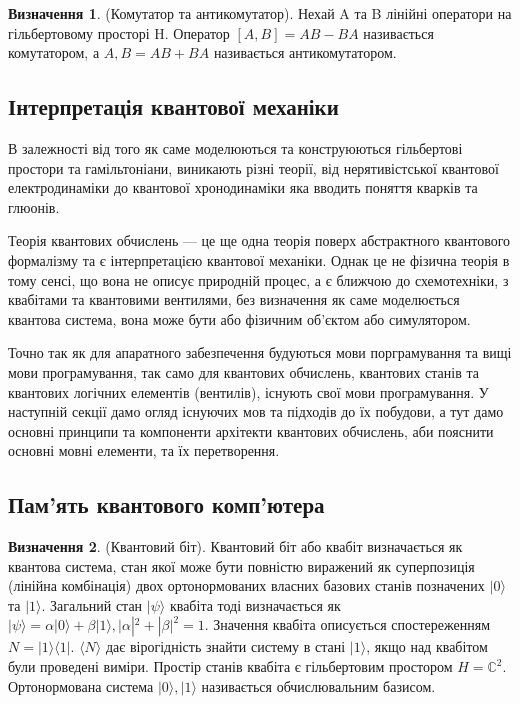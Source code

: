 \documentclass{article}
\theoremstyle{definition}
\newtheorem{definition}{Визначення}
\begin{document}
\begin{definition} (Комутатор та антикомутатор).
Нехай A та B лінійні оператори на гільбертовому просторі H.
Оператор $[A,B] = AB - BA$ називається комутатором,
а ${A,B} = AB + BA$ називається антикомутатором.
\end{definition}

\subsection{Інтерпретація квантової механіки}

В залежності від того як саме моделюються та конструюються
гільбертові простори та гамільтоніани, виникають різні теорії,
від нерятивістської квантової електродинаміки до квантової хронодинаміки яка
вводить поняття кварків та глюонів.

Теорія квантових обчислень --- це ще одна теорія поверх абстрактного квантового формалізму та
є інтерпретацією квантової механіки.
Однак це не фізична теорія в тому сенсі, що вона не описує природній процес,
а є ближчою до схемотехніки, з квабітами та квантовими вентилями, без визначення
як саме моделюється квантова система, вона може бути або фізичним об'єктом або симулятором.

Точно так як для апаратного забезпечення будуються мови порграмування та вищі мови програмування,
так само для квантових обчислень, квантових станів та квантових логічних елементів (вентилів),
існують свої мови програмування. У наступній секції дамо огляд існуючих мов та підходів до їх
побудови, а тут дамо основні принципи та компоненти архітекти квантових
обчислень, аби пояснити основні мовні елементи, та їх перетворення.

\newpage
\subsection{Пам'ять квантового комп'ютера}

\begin{definition} (Квантовий біт). Квантовий біт або квабіт визначається як квантова система,
стан якої може бути повністю виражений як суперпозиція (лінійна комбінація)
двох ортонормованих власних базових станів
позначених $|0\rangle$ та $|1\rangle$. Загальний стан $|\psi\rangle$ квабіта  тоді визначається
як $|\psi\rangle = \alpha |0\rangle + \beta |1\rangle, |\alpha|^2 + |\beta|^2 = 1$.
Значення квабіта описується спостереженням $N=|1\rangle\langle{1}|$. $\langle{N}\rangle$ дає
вірогідність знайти систему в стані $|1\rangle$, якщо над квабітом були проведені виміри.
Простір станів квабіта є гільбертовим простором $H=\mathbb{C}^2$.
Ортонормована система ${|0\rangle,|1\rangle}$ називається обчислювальним базисом.
\end{definition}
\end{document}

